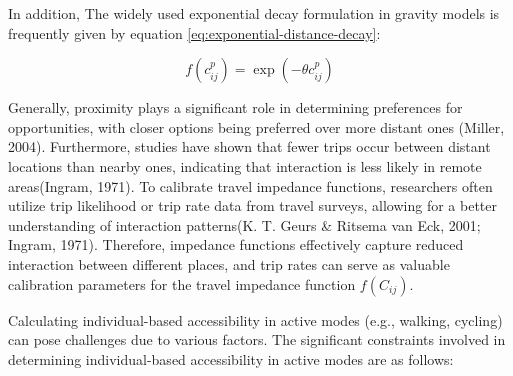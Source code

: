 \documentclass[
11pt, %
oneside, %
english, %
singlespacing, %
]{macthesis} %
\begin{document}
In addition, The widely used exponential decay formulation in gravity models is frequently given by equation \eqref{eq:exponential-distance-decay}:

\begin{equation}
f(c^p_{ij}) = \exp(-\theta c^p_{ij})
\label{eq:exponential-distance-decay}
\end{equation}

Generally, proximity plays a significant role in determining preferences for opportunities, with closer options being preferred over more distant ones (Miller, 2004). Furthermore, studies have shown that fewer trips occur between distant locations than nearby ones, indicating that interaction is less likely in remote areas(Ingram, 1971). To calibrate travel impedance functions, researchers often utilize trip likelihood or trip rate data from travel surveys, allowing for a better understanding of interaction patterns(K. T. Geurs \& Ritsema van Eck, 2001; Ingram, 1971). Therefore, impedance functions effectively capture reduced interaction between different places, and trip rates can serve as valuable calibration parameters for the travel impedance function \(f(C_{ij})\).

Calculating individual-based accessibility in active modes (e.g., walking, cycling) can pose challenges due to various factors. The significant constraints involved in determining individual-based accessibility in active modes are as follows:
\end{document}
